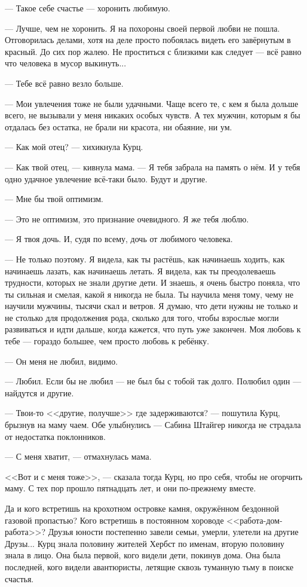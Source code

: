 --- Такое себе счастье --- хоронить любимую.

--- Лучше, чем не хоронить.
Я на похороны своей первой любви не пошла.
Отговорилась делами, хотя на деле просто побоялась видеть его завёрнутым в красный.
До сих пор жалею.
Не проститься с близкими как следует --- всё равно что человека в мусор выкинуть...

--- Тебе всё равно везло больше.

--- Мои увлечения тоже не были удачными.
Чаще всего те, с кем я была дольше всего, не вызывали у меня никаких особых чувств.
А тех мужчин, которым я бы отдалась без остатка, не брали ни красота, ни обаяние, ни ум.

--- Как мой отец? --- хихикнула Курц.

--- Как твой отец, --- кивнула мама.
--- Я тебя забрала на память о нём.
И у тебя одно удачное увлечение всё-таки было.
Будут и другие.

--- Мне бы твой оптимизм.

--- Это не оптимизм, это признание очевидного.
Я же тебя люблю.

--- Я твоя дочь.
И, судя по всему, дочь от любимого человека.

--- Не только поэтому.
Я видела, как ты растёшь, как начинаешь ходить, как начинаешь лазать, как начинаешь летать.
Я видела, как ты преодолеваешь трудности, которых не знали другие дети.
И знаешь, я очень быстро поняла, что ты сильная и смелая, какой я никогда не была.
Ты научила меня тому, чему не научили мужчины, тысячи скал и ветров.
Я думаю, что дети нужны не только и не столько для продолжения рода, сколько для того, чтобы взрослые могли развиваться и идти дальше, когда кажется, что путь уже закончен.
Моя любовь к тебе --- гораздо большее, чем просто любовь к ребёнку.

--- Он меня не любил, видимо.

--- Любил.
Если бы не любил --- не был бы с тобой так долго.
Полюбил один --- найдутся и другие.

--- Твои-то <<другие, получше>> где задерживаются? --- пошутила Курц, брызнув на маму чаем.
Обе улыбнулись --- Сабина Штайгер никогда не страдала от недостатка поклонников.

--- С меня хватит, --- отмахнулась мама.

<<Вот и с меня тоже>>, --- сказала тогда Курц, но про себя, чтобы не огорчить маму.
С тех пор прошло пятнадцать лет, и они по-прежнему вместе.

Да и кого встретишь на крохотном островке камня, окружённом бездонной газовой пропастью?
Кого встретишь в постоянном хороводе <<работа-дом-работа>>?
Друзья юности постепенно завели семьи, умерли, улетели на другие Друзы...
Курц знала половину жителей Хербст по именам, вторую половину знала в лицо.
Она была первой, кого видели дети, покинув дома.
Она была последней, кого видели авантюристы, летящие сквозь туманную тьму в поиске счастья.

